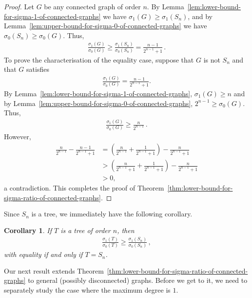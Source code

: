 \documentclass[a4paper,12pt]{amsart}
\newtheorem{cor}{Corollary}
\begin{document}
\begin{proof}
    Let $G$ be any connected graph of order $n$. By Lemma~\ref{lem:lower-bound-for-sigma-1-of-connected-graphs} we have $\sigma_1(G) \ge \sigma_1(S_n)$, and by Lemma~\ref{lem:upper-bound-for-sigma-0-of-connected-graphs} we have $\sigma_0(S_n) \ge \sigma_0(G)$. Thus,
    \begin{align*}
        \frac{\sigma_1(G)}{\sigma_0(G)} \ge \frac{\sigma_1(S_n)}{\sigma_0(S_n)}=\frac{n-1}{2^{n-1}+1}\,.
    \end{align*}
To prove the characterisation of the equality case, suppose that $G$ is not %
$S_n$ and that $G$ satisfies 
    \begin{align*}
        \frac{\sigma_1(G)}{\sigma_0(G)} = \frac{n-1}{2^{n-1}+1}.
    \end{align*}
    By Lemma~\ref{lem:lower-bound-for-sigma-1-of-connected-graphs}, $\sigma_1(G) \ge n$ and by Lemma~\ref{lem:upper-bound-for-sigma-0-of-connected-graphs}, $2^{n-1}\geq \sigma_0(G)$. Thus,
    \begin{align*}
     \frac{\sigma_1(G)}{\sigma_0(G)} \ge \frac{n}{2^{n-1}}\,.
    \end{align*}
    However,
    \begin{align*}
        \frac{n}{2^{n-1}} - \frac{n-1}{2^{n-1}+1} &= \left( \frac{n}{2^{n-1}}  +   \frac{1}{2^{n-1}+1}    \right) -  \frac{n}{2^{n-1}+1}\\
        &>\left( \frac{n}{2^{n-1}+1}  +   \frac{1}{2^{n-1}+1}    \right) -  \frac{n}{2^{n-1}+1}\\
        &>0,
    \end{align*}
    a contradiction. This completes the proof of Theorem~\ref{thm:lower-bound-for-sigma-ratio-of-connected-graphs}.
\end{proof}

\medskip
Since $S_n$ is a tree, we immediately have the following corollary.

\begin{cor}
    \label{cor:lower-bound-for-sigma-ratio-of-trees}
    If $T$ is a tree of order $n$, then 
    \begin{align*}
        \frac{\sigma_1(T)}{\sigma_0(T)} \ge \frac{\sigma_1(S_n)}{\sigma_0(S_n)}\,,
    \end{align*}
    with equality if and only if $T = S_n$.
\end{cor}

\medskip
Our next result extends Theorem~\ref{thm:lower-bound-for-sigma-ratio-of-connected-graphs} to general (possibly disconnected) graphs. Before we get to it, we need to separately study the case where the maximum degree is $1$.
\end{document}
